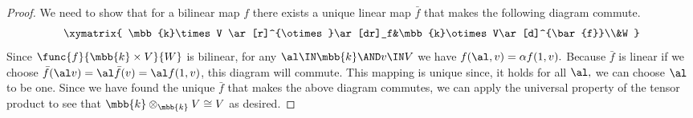 \documentclass[main.tex]{subfiles}
\begin{document}
\begin{proof}
We need to show that for a bilinear map $ f $ there exists a unique linear map 
$ \bar{f} $ that makes the following diagram commute.
$$
\xymatrix{ \mbb{k}\times V \ar[r]^{\otimes}\ar[dr]_f&\mbb{k}\otimes V\ar[d]^{\bar{f}}\\&W	
}
$$
Since $ \func{f}{\mbb{k}\times V}{W} $ is bilinear, for any $ \al\IN\mbb{k}\AND 
v\IN V  $ we have $ f(\al,v) =\alpha f(1,v).$ Because $ \bar{f} $ is linear if we choose $ \bar{f}(\al v)=\al 
\bar{f}(v)=\al f(1,v) $, this diagram will commute. This mapping is 
unique since, it holds for all $ \al,$ we can choose $ \al $ to be one. Since 
we have found the unique $ \bar{f} $ that makes the above diagram commutes,
we can apply the universal property of the tensor product to see that $ 
\mbb{k}\otimes_{\mbb{k}} V\cong V $ as desired. 


\end{proof}
\end{document}
